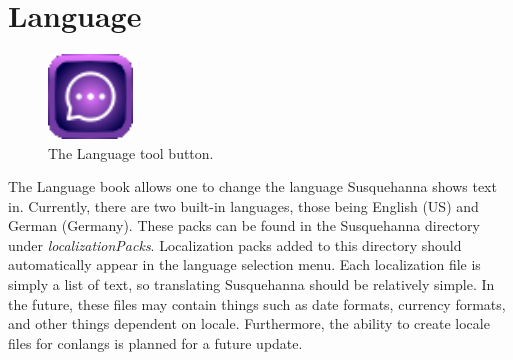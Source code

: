 \documentclass{report}
\begin{document}
	\section{Language}
	\begin{figure}
		\centering
		\includegraphics[width=0.2\textwidth]{img/language}
		\caption{The Language tool button.}
		\label{fig:language}
	\end{figure}
	The Language book allows one to change the language Susquehanna shows text in. Currently, there are two built-in languages, those being English (US) and German (Germany). These packs can be found in the Susquehanna directory under \mbox{\emph{localizationPacks}}. Localization packs added to this directory should automatically appear in the language selection menu. Each localization file is simply a list of text, so translating Susquehanna should be relatively simple. In the future, these files may contain things such as date formats, currency formats, and other things dependent on locale. Furthermore, the ability to create locale files for conlangs is planned for a future update.
	
	
	
\end{document}
